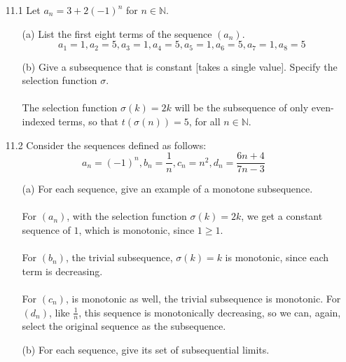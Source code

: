 
\usepackage{amsmath, dsfont}

\oddsidemargin 0in
\evensidemargin 0in
\textwidth 6.5in
\topmargin -0.5in
\textheight 9.0in
\newcommand{\norm}[1]{\left\lVert #1 \right\rVert}
\newcommand{\abs}[1]{\left\vert #1 \right\vert}
\newcommand{\?}{\stackrel{?}{=}}



\pagestyle{myheadings}

\begin{itemize}
  \item [11.1]
    Let $a_n = 3 + 2(-1)^n$ for $n \in \mathds{N}$.
    \begin{itemize}
      \item [(a)] List the first eight terms of the sequence $(a_n)$.        
        $$a_1 = 1, a_2 = 5, a_3 = 1, a_4 = 5, a_5 = 1, a_6 = 5, a_7 = 1, a_8 = 5$$


      \item [(b)] Give a subsequence that is constant [takes a single value]. Specify the selection function $\sigma$.\\\\

        The selection function $\sigma(k) = 2k$ will be the subsequence of only even-indexed terms, so that $t(\sigma(n)) = 5$, for all $n \in \mathds{N}$.
    \end{itemize}
  \item [11.2]
    Consider the sequences defined as follows:
    $$a_n = (-1)^n, b_n = \frac{1}{n}, c_n = n^2, d_n = \frac{6n+4}{7n-3}$$
    \begin{itemize}
      \item [(a)] For each sequence, give an example of a monotone subsequence.\\\\

        For $(a_n)$, with the selection function $\sigma(k) = 2k$, we get a constant sequence of $1$, which is monotonic, since $1 \geq 1$.\\\\
        For $(b_n)$, the trivial subsequence, $\sigma(k) = k$ is monotonic, since each term is decreasing.\\\\
        For $(c_n)$, is monotonic as well, the trivial subsequence is monotonic.
        For $(d_n)$, like $\frac{1}{n}$, this sequence is monotonically decreasing, so we can, again, select the original sequence as the subsequence.\\
      \item [(b)] For each sequence, give its set of subsequential limits.\\\\
        

\end{itemize}
\end{itemize}
